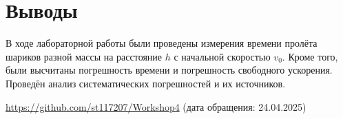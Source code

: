 \section{Выводы}
В ходе лабораторной работы были проведены измерения времени пролёта шариков разной массы на расстояние $h$ с начальной скоростью $v_0$. Кроме того, были высчитаны погрешность времени и погрешность свободного ускорения. Проведён анализ систематических погрешностей и их источников.


\begin{thebibliography}{9}

\url{https://github.com/st117207/Workshop4}  (дата обращения: 24.04.2025) 


\end{thebibliography}

